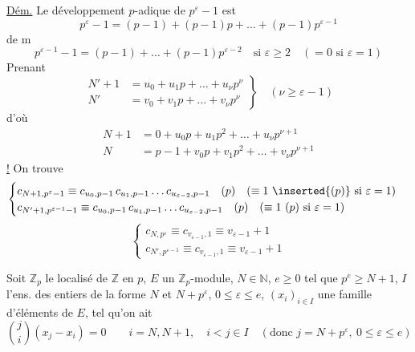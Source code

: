 \uline{Dém.} Le développement $p$-adique de $p^\varepsilon-1$ est
\[
p^\varepsilon-1=(p-1)+(p-1)p+\dots+(p-1)p^{\varepsilon-1}
\]
de m
\[
p^{\varepsilon-1}-1=(p-1)+\dots+(p-1)p^{\varepsilon-2}\quad\text{si }\varepsilon\geq2\quad(=0\text{ si }\varepsilon=1)
\]
Prenant
\[
\left.\begin{aligned}
N'+1&=u_0+u_1p+\dots+u_\nu p^\nu\\
N'&=v_0+v_1p+\dots+v_\nu p^\nu
\end{aligned}\right\}\quad(\nu\geq\varepsilon-1)
\]
d'où
\[
\begin{aligned}
N+1&=0+u_0p+u_1p^2+\dots+u_\nu p^{\nu+1}\\
N&=p-1+v_0p+v_1p^2+\dots+v_\nu p^{\nu+1}
\end{aligned}
\]
\uline{!} On trouve
\[
\begin{cases}
c_{N+1,p^\varepsilon-1}\equiv c_{u_0,p-1}\,c_{u_1,p-1}\dots c_{u_{\varepsilon-2},p-1}\quad(p)\quad(\equiv1\ \inserted{(p)}\text{ si }\varepsilon=1)\\
c_{N'+1,p^{\varepsilon-1}-1}\equiv c_{u_0,p-1}\,c_{u_1,p-1}\dots c_{u_{\varepsilon-2},p-1}\quad(p)\quad(\equiv1\ (p)\text{ si }\varepsilon=1)
\end{cases}
\]
\[
\begin{cases}
c_{N,p^\varepsilon}\equiv c_{v_{\varepsilon-1},1}\equiv v_{\varepsilon-1}+1\\
c_{N',p^{\varepsilon-1}}\equiv c_{v_{\varepsilon-1},1}\equiv v_{\varepsilon-1}+1
\end{cases}
\]

 Soit $\mathbb Z_p$ le localisé de $\mathbb Z$ en $p$, $E$ un $\mathbb Z_p$-module, $N\in\mathbb N$, $e\geq0$ tel que $p^e\geq N+1$,  $I$ l'ens. des entiers de la forme $N$ et $N+p^\varepsilon$, $0\leq\varepsilon\leq e$, $(x_i)_{i\in I}$ une famille d'éléments de $E$, tel qu'on ait
\[
\binom ji(x_j-x_i)=0\qquad i=N,N+1,\quad i<j\in I\quad(\text{donc }j=N+p^\varepsilon,\ 0\leq\varepsilon\leq e)
\]


